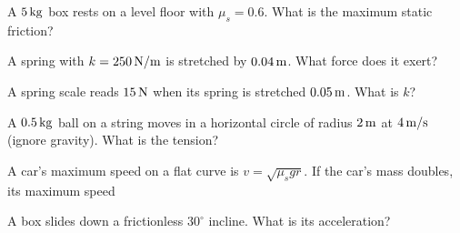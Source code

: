 \begin{exo}{}
A $5\,\mathrm{kg}$ box rests on a level floor with $\mu_s=0.6$. What is the maximum static friction?
\choices{$3\N$}{$50\N$}{$30\N$}{$8.3\N$}
\end{exo}
\begin{exo}{}
A spring with $k=250\,\mathrm{N/m}$ is stretched by $0.04\,\mathrm{m}$. What force does it exert?
\choices{$10\N$}{$6250\N$}{$1\N$}{$100\N$}
\end{exo}
\begin{exo}{}
A spring scale reads $15\,\mathrm{N}$ when its spring is stretched $0.05\,\mathrm{m}$. What is $k$?
\choices{$0.75\Nm$}{$3\Nm$}{$300\Nm$}{$30\Nm$}
\end{exo}
\begin{exo}{}
A $0.5\,\mathrm{kg}$ ball on a string moves in a horizontal circle of radius $2\,\mathrm{m}$ at $4\,\mathrm{m/s}$ (ignore gravity). What is the tension?
\choices{$1\N$}{$8\N$}{$16\N$}{$4\N$}
\end{exo}
\begin{exo}{}
A car's maximum speed on a flat curve is $v=\sqrt{\mu_sgr}$. If the car's mass doubles, its maximum speed
\end{exo}
\begin{exo}{}
A box slides down a frictionless $30^\circ$ incline. What is its acceleration?
\end{exo}
